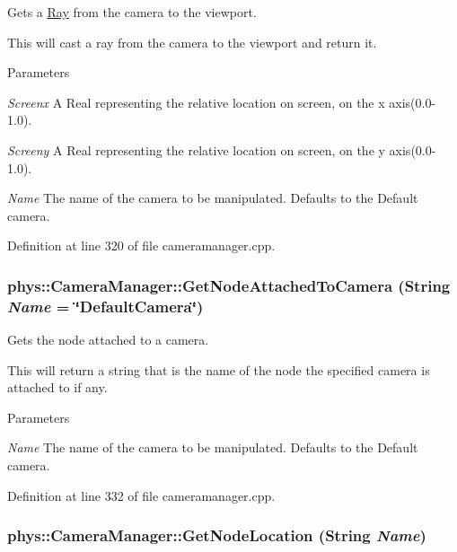 Gets a \hyperlink{classphys_1_1Ray}{Ray} from the camera to the viewport. 

This will cast a ray from the camera to the viewport and return it. 
\begin{DoxyParams}{Parameters}
\item[{\em Screenx}]A Real representing the relative location on screen, on the x axis(0.0-\/1.0). \item[{\em Screeny}]A Real representing the relative location on screen, on the y axis(0.0-\/1.0). \item[{\em Name}]The name of the camera to be manipulated. Defaults to the Default camera. \end{DoxyParams}


Definition at line 320 of file cameramanager.cpp.

\hypertarget{classphys_1_1CameraManager_a52a62fcfbeed45a2f527f626731ddcc1}{
\subsubsection[{GetNodeAttachedToCamera}]{ phys::CameraManager::GetNodeAttachedToCamera ({\bf String} {\em Name} = {\ttfamily \char`\"{}DefaultCamera\char`\"{}})}}
\label{d9/d91/classphys_1_1CameraManager_a52a62fcfbeed45a2f527f626731ddcc1}


Gets the node attached to a camera. 

This will return a string that is the name of the node the specified camera is attached to if any. 
\begin{DoxyParams}{Parameters}
\item[{\em Name}]The name of the camera to be manipulated. Defaults to the Default camera. \end{DoxyParams}


Definition at line 332 of file cameramanager.cpp.

\hypertarget{classphys_1_1CameraManager_af5fcec9bebd90b8e98b0d2f4def97ea1}{
\subsubsection[{GetNodeLocation}]{ phys::CameraManager::GetNodeLocation ({\bf String} {\em Name})}}
\label{d9/d91/classphys_1_1CameraManager_af5fcec9bebd90b8e98b0d2f4def97ea1}


